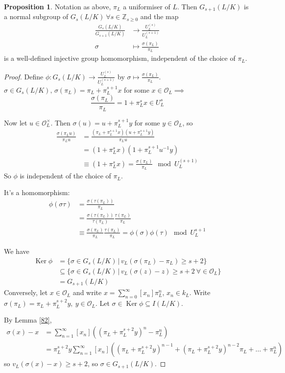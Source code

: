 \documentclass[a4paper]{article}
\theoremstyle{definition}
\theoremstyle{default}
\newtheorem{prop}[definition]{Proposition}
\theoremstyle{remark}
\DeclareMathOperator{\Ker}{Ker}
\begin{document}
\begin{prop}
	Notation as above, $\pi_L$ a uniformiser of $L$.
	Then $G_{s+1}(L/K)$ is a normal subgroup of $G_s(L/K)\ \forall s \in \mathbb{Z}_{s \geq 0}$
	and the map
	\begin{align*}
		\frac{G_s(L/K)}{G_{s+1}(L/K)} &\to \frac{U_L^{(s)}}{U_L^{(s+1)}} \\
		\sigma &\mapsto \frac{\sigma(\pi_L)}{\pi_L}
	\end{align*}
	is a well-defined injective group homomorphism,
	independent of the choice of $\pi_L$.
\end{prop}
\begin{proof}
	Define $\phi: G_s(L/K) \to \frac{U_L^{(s)}}{U_L^{(s+1)}}$ by $\sigma \mapsto \frac{\sigma(\pi_L)}{\pi_L}$.
	$\sigma \in G_s(L/K),\, \sigma(\pi_L) = \pi_L + \pi_L^{s+1}x$ for some $x \in \mathcal{O}_L \implies$
	$$\frac{\sigma(\pi_L)}{\pi_L} = 1+\pi_L^sx \in U_L^{s}$$
	
	Now let $u \in \mathcal{O}_L^\times$.
	Then $\sigma(u) = u+\pi_L^{s+1}y$ for some $y \in \mathcal{O}_L$, so
	\begin{align*}
		\frac{\sigma(\pi_Lu)}{\pi_Lu} &= \frac{(\pi_L + \pi_L^{s+1}x)(u+\pi_L^{s+1}y)}{\pi_Lu} \\
		&= (1+\pi_L^sx)(1+\pi_L^{s+1}u^{-1}y) \\
		&\equiv (1+\pi_L^s x) = \frac{\sigma(\pi_L)}{\pi_L} \mod U_L^{(s+1)}
	\end{align*}
	So $\phi$ is independent of the choice of $\pi_L$.
	
	It's a homomorphism:
	\begin{align*}
		\phi(\sigma\tau) &= \frac{\sigma(\tau(\pi_L))}{\pi_L} \\
		&= \frac{\sigma(\tau(\pi_L))}{\tau(\pi_L)} \frac{\tau(\pi_L)}{\pi_L} \\
		&\equiv \frac{\sigma(\pi_L)}{\pi_L} \frac{\tau(\pi_L)}{\pi_L} = \phi(\sigma)\phi(\tau) \mod U_L^{s+1}
	\end{align*}
	
	We have
	\begin{align*}
		\Ker\phi &= \{\sigma \in G_s(L/K) \,|\, v_L(\sigma(\pi_L) - \pi_L) \geq s+2 \} \\
		&\subseteq \{\sigma \in G_s(L/K) \,|\, v_L(\sigma(z) - z) \geq s+2 \ \forall \in \mathcal{O}_L \}\\
		&= G_{s+1}(L/K)
	\end{align*}
	Conversely, let $x \in \mathcal{O}_L$ and write $x = \sum_{n=0}^\infty[x_n]\pi_L^n$, $x_n \in k_L$.
	Write $\sigma(\pi_L)=\pi_L + \pi_L^{s+2}y,\ y \in \mathcal{O}_L$.
	Let $\sigma \in \Ker \phi \subseteq I(L/K)$.
	
	By Lemma \ref{82},
	\begin{align*}
		\sigma(x)-x &= \sum_{n=1}^\infty[x_n]((\pi_L + \pi_L^{s+2}y)^n - \pi_L^n) \\
		&= \pi_L^{s+2}y \sum_{n=1}^\infty[x_n]((\pi_L + \pi_L^{s+2}y)^{n-1} + (\pi_L + \pi_L^{s+2}y)^{n-2}\pi_L + \dots + \pi_L^n)
	\end{align*}
	so $v_L(\sigma(x) -x) \geq s+2$, so $\sigma \in G_{s+1}(L/K)$.
\end{proof}
\end{document}
